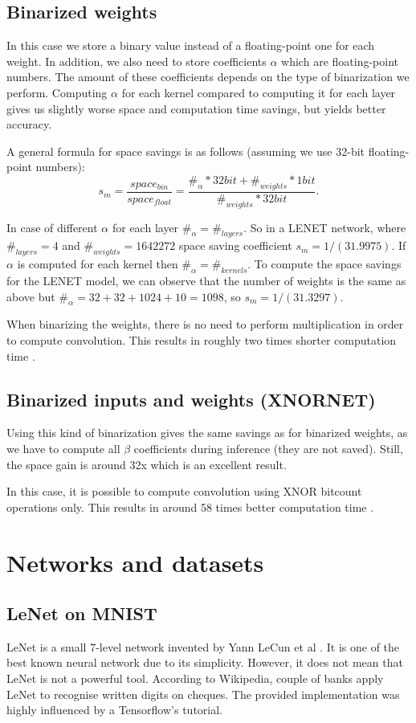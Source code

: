 \documentclass[licencjacka]{pracamgr}
\begin{document}
    \section{Binarized weights}
        In this case we store a binary value instead of a floating-point one for each weight. In addition, we also need to store coefficients $\alpha$ which are floating-point numbers. The amount of these coefficients depends on the type of binarization we perform. Computing $\alpha$ for each kernel compared to computing it for each layer gives us slightly worse space and computation time savings, but yields better accuracy.
        
        A general formula for space savings is as follows (assuming we use 32-bit floating-point numbers):
        $$s_m =  \frac{space_{bin}}{space_{float}} = \frac{\#_\alpha * 32bit + \#_{weights}*1bit}{\#_{weights} * 32bit} \text{.}$$
        
        In case of different $\alpha$ for each layer $\#_\alpha = \#_{layers}$. So in a LENET network, where $\#_{layers} = 4$ and $\#_{weights} = 1642272$ space saving coefficient $s_m = 1/(31.9975)$. If $\alpha$ is computed for each kernel then $\#_\alpha = \#_{kernels}$. To compute the space savings for the LENET model, we can observe that the number of weights is the same as above but $\#_\alpha = 32+32+1024+10 = 1098$, so $s_m = 1/(31.3297)$.
            
	    When binarizing the weights, there is no need to perform multiplication in order to compute convolution. This results in roughly two times shorter computation time \cite{xnornet}.
	    
	    \section{Binarized inputs and weights (XNORNET)}
	    Using this kind of binarization gives the same savings as for binarized weights, as we have to compute all $\beta$ coefficients during inference (they are not saved). Still, the space gain is around 32x which is an excellent result.
	    
	    In this case, it is possible to compute convolution using XNOR bitcount operations only. This results in around 58 times better computation time \cite{xnornet}.

\chapter{Networks and datasets}
		\section{LeNet on MNIST}
 		LeNet is a small 7-level network invented by Yann LeCun et al \cite{lenet}. It is one of the best known neural network due to its simplicity. However, it does not mean that LeNet is not a powerful tool. According to Wikipedia, couple of banks apply LeNet to recognise written digits on cheques.  The provided implementation was highly influenced by a Tensorflow's tutorial. \\
\end{document}
